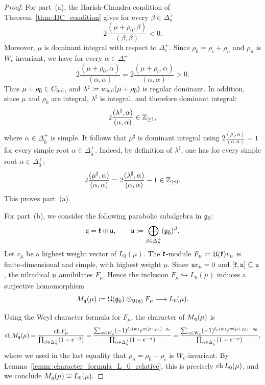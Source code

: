 \begin{proof}
For part~(a), the Harish-Chandra condition of
Theorem~\ref{thm::HC_condition} gives for every $\beta \in \Delta_{n}^{+}$
\[
2\frac{(\mu+\rho_{\bar0},\beta)}{(\beta,\beta)}<0.
\]
Moreover, $\mu$ is dominant integral with respect to
$\Delta_c^+$. Since
$\rho_{\bar0}=\rho_c+\rho_n$ and $\rho_n$ is
$W_c$-invariant, we have for every $\alpha\in\Delta_c^+$
\[
2\frac{(\mu+\rho_{\bar0},\alpha)}{(\alpha,\alpha)}
=
2\frac{(\mu+\rho_c,\alpha)}{(\alpha,\alpha)}
>0.
\]
Thus $\mu+\rho_{\bar0}\in C_{\operatorname{hol}}$, and
$
\lambda^\sharp
\coloneqq
w_{\operatorname{hol}}(\mu+\rho_{\bar0})
$
is regular dominant. In addition, since $\mu$ and $\rho_{\bar{0}}$ are integral, $\lambda^{\sharp}$ is integral, and therefore dominant integral: 
\[
2\frac{(\lambda^\sharp,\alpha)}{(\alpha,\alpha)}
\in{\mathbb Z}_{\geq1},
\]
where $\alpha\in \Delta_{\bar{0}}^{+}$ is simple. It follows that $\mu^{\sharp}$ is dominant integral using 
$
2\tfrac{(\rho_{\bar0},\alpha)}{(\alpha,\alpha)}=1
$
for every simple root $\alpha\in \Delta_{\bar{0}}^{+}$. Indeed, by definition of $\lambda^{\sharp}$, one has for every simple root $\alpha\in \Delta_{\bar{0}}^{+}$:
\[
2\frac{(\mu^\sharp,\alpha)}{(\alpha,\alpha)}
=
2\frac{(\lambda^\sharp,\alpha)}{(\alpha,\alpha)}-1
\in{\mathbb Z}_{\geq0}.
\]
This proves part~(a).

For part~(b), we consider the following parabolic subalgebra in ${\mathfrak{g}_{\bar{0}}}$:
\[
{\mathfrak q}={\mathfrak k}\oplus{\mathfrak u},
\qquad
{\mathfrak u}\coloneqq
\bigoplus_{\beta\in\Delta_n^+}({\mathfrak{g}_{\bar{0}}})^\beta.
\]
Let $v_\mu$ be a highest weight vector of $L_0(\mu)$.
The ${\mathfrak k}$-module $F_{\mu}\coloneqq{\mathfrak U}({\mathfrak k})v_\mu
$ is finite-dimensional and simple, with highest weight
$\mu$. Since ${\mathfrak u} v_\mu=0$ and
$[{\mathfrak k},{\mathfrak u}]\subseteq{\mathfrak u}$, the nilradical ${\mathfrak u}$
annihilates $F_{\mu}$. Hence the inclusion
$F_{\mu}\hookrightarrow L_0(\mu)$ induces a surjective
homomorphism
\[
M_{{\mathfrak q}}(\mu)
\coloneqq
{\mathfrak U}({\mathfrak{g}_{\bar{0}}})\otimes_{{\mathfrak U}({\mathfrak q})}F_{\mu}
\longrightarrow
L_0(\mu).
\]

Using the Weyl character formula for $F_{\mu}$, the character of $M_{{\mathfrak q}}(\mu)$ is
\[
\begin{aligned}
\operatorname{ch} M_{{\mathfrak q}}(\mu)
=
\frac{\operatorname{ch} F_{\mu}}
{\prod_{\beta\in\Delta_n^+}
(1-e^{-\beta})}=
\frac{
\sum_{w\in W_c}
(-1)^{\ell_c(w)}
e^{w(\mu+\rho_c)-\rho_c}
}{
\prod_{\alpha\in\Delta_{\bar0}^+}
(1-e^{-\alpha})
}=
\frac{
\sum_{w\in W_c}
(-1)^{\ell_c(w)}
e^{w(\mu+\rho_{\bar0})-\rho_{\bar0}}
}{
\prod_{\alpha\in\Delta_{\bar0}^+}
(1-e^{-\alpha})
},
\end{aligned}
\]
where we used in the last equality that $\rho_n=\rho_{\bar0}-\rho_c$ is $W_{c}$-invariant.
By Lemma~\ref{lemm::character_formula_L_0_relative}, this is precisely
$\operatorname{ch} L_0(\mu)$, and we conclude
$
M_{{\mathfrak q}}(\mu)\cong L_0(\mu).
$


\end{proof}
